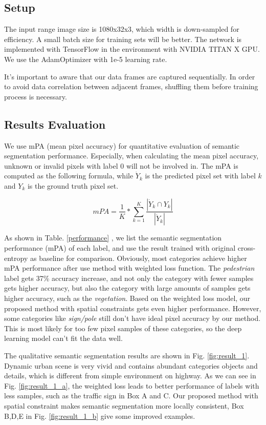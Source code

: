 \subsection{Setup}
The input range image size is 1080x32x3, which width is down-sampled for efficiency. A small batch size for training sets will be better. The network is implemented with TensorFlow in the environment with NVIDIA TITAN X GPU. We use the AdamOptimizer with 1e-5 learning rate.

It's important to aware that our data frames are captured sequentially. In order to avoid data correlation between adjacent frames, shuffling them before training process is necessary.

\subsection{Results Evaluation}
We use mPA (mean pixel accuracy) for quantitative evaluation of semantic segmentation performance. Especially, when calculating the mean pixel accuracy, unknown or invalid pixels with label 0 will not be involved in. The mPA is computed as the following formula, while $\dot{Y}_k$ is the predicted pixel set with label $k$ and $Y_k$ is the ground truth pixel set.

\begin{equation}
mPA = \dfrac{1}{K}*\sum_{k=1}^{K}\dfrac{\left| \dot{Y}_k \cap Y_k \right|}{\left| \dot{Y}_k\right|}
\end{equation}


As shown in Table. \ref{performance} , we list the semantic segmentation performance (mPA) of each label, and use the result trained with original cross-entropy as baseline for comparison. Obviously, most categories achieve higher mPA performance after use method with weighted loss function. The \textit{pedestrian} label gets 37\% accuracy increase, and not only the category with fewer samples gets higher accuracy, but also the category with large amounts of samples gets higher accuracy, such as the \textit{vegetation}. Based on the weighted loss model, our proposed method with spatial constraints gets even higher performance. However, some categories like \textit{sign/pole} still don't have ideal pixel accuracy by our method. This is most likely for too few pixel samples of these categories, so the deep learning model can't fit the data well.

The qualitative semantic segmentation results are shown in Fig. \ref{fig:result_1}. Dynamic urban scene is very vivid and contains abundant categories objects and details, which is different from simple environment on highway. As we can see in Fig. \ref{fig:result_1_a}, the weighted loss leads to better performance of labels with less samples, such as the traffic sign in Box A and C. Our proposed method with spatial constraint makes semantic segmentation more locally consistent, Box B,D,E in Fig. \ref{fig:result_1_b} give some improved examples.


